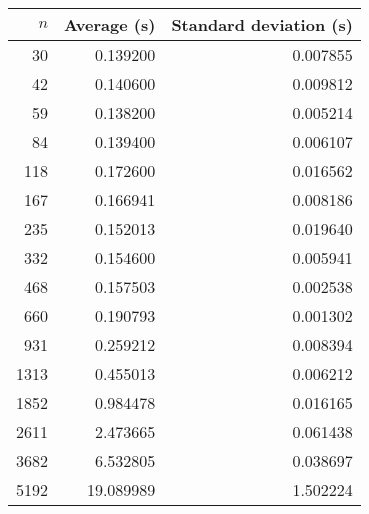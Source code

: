 \begin{tabular}{rrr}
$n$ & Average (s) & Standard deviation (s) \\\hline
30 & 0.139200 & 0.007855\\ 
42 & 0.140600 & 0.009812\\ 
59 & 0.138200 & 0.005214\\ 
84 & 0.139400 & 0.006107\\ 
118 & 0.172600 & 0.016562\\ 
167 & 0.166941 & 0.008186\\ 
235 & 0.152013 & 0.019640\\ 
332 & 0.154600 & 0.005941\\ 
468 & 0.157503 & 0.002538\\ 
660 & 0.190793 & 0.001302\\ 
931 & 0.259212 & 0.008394\\ 
1313 & 0.455013 & 0.006212\\ 
1852 & 0.984478 & 0.016165\\ 
2611 & 2.473665 & 0.061438\\ 
3682 & 6.532805 & 0.038697\\ 
5192 & 19.089989 & 1.502224\\ 
\end{tabular}
